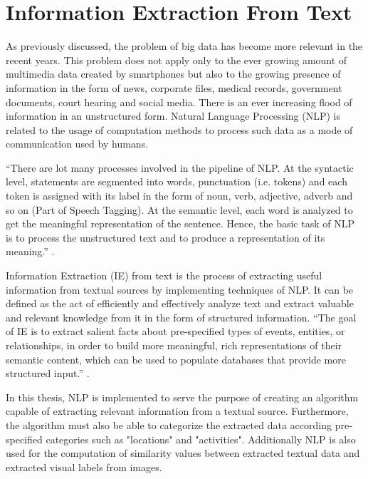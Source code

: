 \cleardoublepage


\chapter{Information Extraction From Text}
\label{ch:nlp}

As previously discussed, the problem of big data has become more relevant in the recent years.  This problem does not apply only to the ever growing amount of multimedia data created by smartphones but also to the growing presence of information in the form of news, corporate files, medical records, government documents, court hearing and social media. There is an ever increasing flood of information in an unstructured form. Natural Language Processing (NLP) is related to the usage of computation methods to process such data as a mode of communication used by humans.

``There are lot many processes involved in the pipeline of NLP. At the syntactic level, statements are segmented into words, punctuation (i.e.  tokens) and each token is assigned with its label in the form of noun, verb, adjective, adverb and so on (Part of Speech Tagging).  At the semantic level, each word is analyzed to get the meaningful representation of the sentence.  Hence, the basic task of NLP is to process the unstructured text and to produce a representation of its meaning.''  \cite{singh2018natural}.



Information Extraction (IE) from text is the process of extracting useful information from textual sources by implementing techniques of NLP. It can be defined as the act of efficiently and effectively analyze text and extract valuable and relevant knowledge from it in the form of structured information. ``The goal of IE is to extract salient facts about pre-specified types of events, entities, or relationships, in order to build more meaningful, rich representations of their semantic content, which can be used to populate databases that provide more structured input.'' \cite{singh2018natural}.

In this thesis, NLP is implemented to serve the purpose of creating an algorithm capable of extracting relevant information from a textual source. Furthermore, the algorithm must also be able to categorize the extracted data according pre-specified categories such as "locations" and "activities". Additionally NLP is also used for the computation of similarity values between extracted textual data and extracted visual labels from images.

